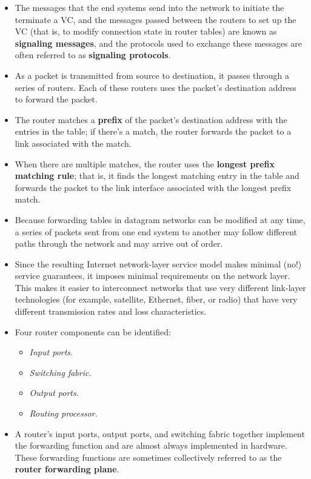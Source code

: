 \begin{itemize}
\item
The messages that the end systems send into the network to initiate the terminate a VC, and the messages passed between the routers to set up the VC (that is, to modify connection state in router tables) are known as \textbf{signaling messages}, and the protocols used to exchange these messages are often referred to as \textbf{signaling protocols}.

\item
As a packet is transmitted from source to destination, it passes through a series of routers. Each of these routers uses the packet's destination address to forward the packet.

\item
The router matches a \textbf{prefix} of the packet's destination address with the entries in the table; if there's a match, the router forwards the packet to a link associated with the match.

\item
When there are multiple matches, the router uses the \textbf{longest prefix matching rule}; that is, it finds the longest matching entry in the table and forwards the packet to the link interface associated with the longest prefix match.

\item
Because forwarding tables in datagram networks can be modified at any time, a series of packets sent from one end system to another may follow different paths through the network and may arrive out of order.

\item
Since the resulting Internet network-layer service model makes minimal (no!) service guarantees, it imposes minimal requirements on the network layer. This makes it easier to interconnect networks that use very different link-layer technologies (for example, satellite, Ethernet, fiber, or radio) that have very different transmission rates and loss characteristics.

\item
Four router components can be identified:
\begin{itemize}
\item\textit{Input ports.}
\item\textit{Switching fabric.}
\item\textit{Output ports.}
\item\textit{Routing processor.}
\end{itemize}

\item
A router's input ports, output ports, and switching fabric together implement the forwarding function and are almost always implemented in hardware. These forwarding functions are sometimes collectively referred to as the \textbf{router forwarding plane}.


\end{itemize}
